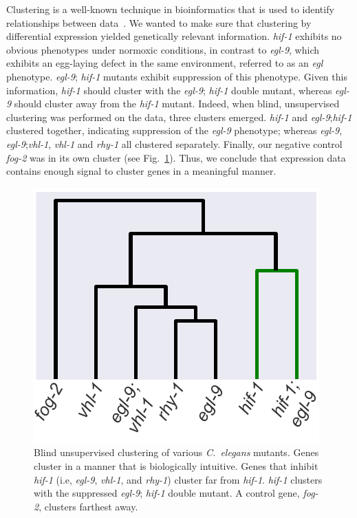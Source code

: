 \documentclass[9pt,twocolumn,twoside]{pnas-new}
\newcommand{\cel}{\emph{C.~elegans}}
\newcommand{\egl}{\emph{egl-9}}
\newcommand{\rhy}{\emph{rhy-1}}
\newcommand{\vhl}{\emph{vhl-1}}
\newcommand{\hif}{\emph{hif-1}}
\newcommand{\fog}{\emph{fog-2}}
\begin{document}
Clustering is a well-known technique in bioinformatics that is used to identify relationships between data~\cite{Yeung2003}. We wanted to make sure that clustering by differential expression yielded genetically relevant information. \hif{} exhibits no obvious phenotypes under normoxic conditions, in contrast to \egl{}, which exhibits an egg-laying defect in the same environment, referred to as an \emph{egl} phenotype. \egl{}; \hif{} mutants exhibit suppression of this phenotype. Given this information, \hif{} should cluster with the \egl{}; \hif{} double mutant, whereas \egl{} should cluster away from the \hif{} mutant.
Indeed, when blind, unsupervised clustering was performed on the data, three clusters emerged. \hif{} and \egl{};\hif{} clustered together, indicating suppression of the \egl{} phenotype; whereas \egl{}, \egl{};\vhl{}, \vhl{} and \rhy{} all clustered separately. Finally, our negative control \fog{} was in its own cluster (see Fig.~\ref{fig:dendrogram}). Thus, we conclude that expression data contains enough signal to cluster genes in a meaningful manner.

\begin{figure}%
\centering
\includegraphics[width=\linewidth]{figs/dendrogram.pdf}
\caption{Blind unsupervised clustering of various \cel{} mutants. Genes cluster in a manner that is biologically intuitive. Genes that inhibit \hif{} (i.e, \egl{}, \vhl{}, and \rhy{}) cluster far from \hif{}. \hif{} clusters with the suppressed \egl{}; \hif{} double mutant. A control gene, \fog{}, clusters farthest away.}
\label{fig:dendrogram}
\end{figure}
\end{document}
